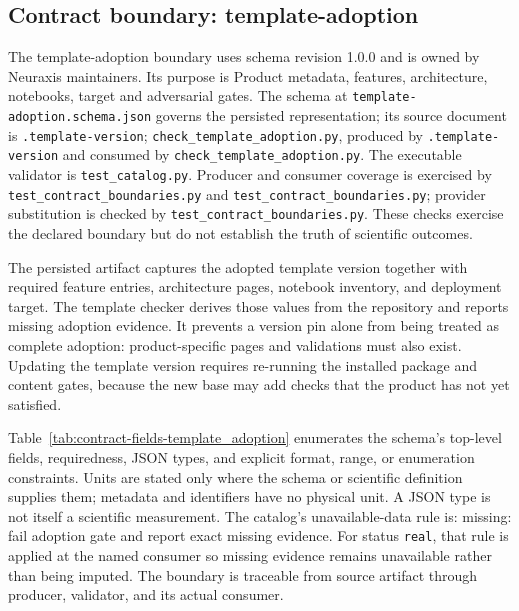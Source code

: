 \subsection{Contract boundary: template-adoption}\label{sec:contract-template_adoption}
The template-adoption boundary uses schema revision 1.0.0 and is owned by Neuraxis maintainers. Its purpose is Product metadata, features, architecture, notebooks, target and adversarial gates. The schema at \texttt{template-adoption.schema.json} governs the persisted representation; its source document is \texttt{.template-version}; \texttt{check\_\allowbreak{}template\_\allowbreak{}adoption.py}, produced by \texttt{.template-version} and consumed by \texttt{check\_\allowbreak{}template\_\allowbreak{}adoption.py}. The executable validator is \texttt{test\_\allowbreak{}catalog.py}. Producer and consumer coverage is exercised by \texttt{test\_\allowbreak{}contract\_\allowbreak{}boundaries.py} and \texttt{test\_\allowbreak{}contract\_\allowbreak{}boundaries.py}; provider substitution is checked by \texttt{test\_\allowbreak{}contract\_\allowbreak{}boundaries.py}. These checks exercise the declared boundary but do not establish the truth of scientific outcomes.

The persisted artifact captures the adopted template version together with required feature entries, architecture pages, notebook inventory, and deployment target. The template checker derives those values from the repository and reports missing adoption evidence. It prevents a version pin alone from being treated as complete adoption: product-specific pages and validations must also exist. Updating the template version requires re-running the installed package and content gates, because the new base may add checks that the product has not yet satisfied.

Table~\ref{tab:contract-fields-template_adoption} enumerates the schema's top-level fields, requiredness, JSON types, and explicit format, range, or enumeration constraints. Units are stated only where the schema or scientific definition supplies them; metadata and identifiers have no physical unit. A JSON type is not itself a scientific measurement. The catalog's unavailable-data rule is: missing: fail adoption gate and report exact missing evidence. For status \texttt{real}, that rule is applied at the named consumer so missing evidence remains unavailable rather than being imputed. The boundary is traceable from source artifact through producer, validator, and its actual consumer.


